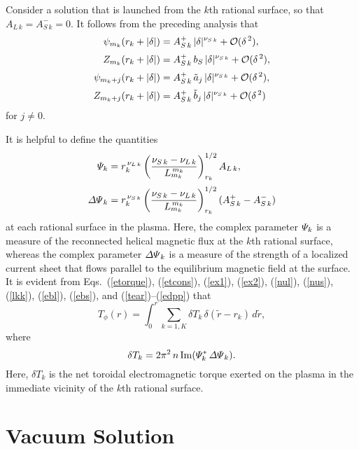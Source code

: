 \documentclass[12pt,prb,aps]{revtex4-1}
\begin{document}
Consider a solution that is launched from the $k$th rational surface, so that $A_{L\,k} = A_{S\,k}^-=0$. It follows from the preceding analysis that
\begin{align}
\psi_{m_k}(r_k+|\delta|) &= A_{S\,k}^+\,|\delta|^{\nu_{S\,k}}+ {\cal O}(\delta^{\,2}),\\[0.5ex]
Z_{m_k}(r_k+|\delta|) &= A_{S\,k}^+\,b_S\,|\delta|^{\nu_{S\,k}}+ {\cal O}(\delta^{\,2}),\\[0.5ex]
\psi_{m_k+j}(r_k+|\delta|)& = A_{S\,k}^+\,\tilde{a}_j\,|\delta|^{\nu_{S\,k}}+ {\cal O}(\delta^{\,2}),\\[0.5ex]
Z_{m_k+j}(r_k+|\delta|) &= A_{S\,k}^+\,\tilde{b}_j\,|\delta|^{\nu_{S\,k}}+ {\cal O}(\delta^{\,2})
\end{align}
for $j\neq 0$. 

It is helpful to define the quantities\,\cite{am1}
\begin{align}\label{Psidef}
{\mit\Psi}_k&= r_k^{\,\nu_{L\,k}}\left(\frac{\nu_{S\,k}-\nu_{L\,k}}{L_{m_k}^{\,{m_k}}}\right)^{1/2}_{r_k} A_{L\,k},\\[0.5ex]
{\mit\Delta\Psi}_k &= r_k^{\,\nu_{S\,k}}\left(\frac{\nu_{S\,k}-\nu_{L\,k}}{L_{m_k}^{\,m_k}}\right)^{1/2}_{r_k} (A_{S\,k}^+ - A_{S\,k}^-)\label{edpp}
\end{align}
at each rational surface in the plasma. Here, the complex parameter ${\mit\Psi}_k$ is a measure of the reconnected helical magnetic flux at the $k$th rational surface, whereas
the complex parameter ${\mit\Delta\Psi}_k$ is a measure of the strength of a localized current sheet that flows parallel to the equilibrium magnetic field at the surface. 
It is evident from Eqs.~(\ref{etorque}), (\ref{etcons}), (\ref{ex1}), (\ref{ex2}), (\ref{nul}), (\ref{nus}), (\ref{lkk}), (\ref{ebl}), (\ref{ebs}), and (\ref{tear})--(\ref{edpp}) that\,\cite{am1,am3}
\begin{equation}\label{e204z}
T_\phi(r) =\int_0^r \sum_{k=1,K}\delta T_k\,\delta(\tilde{r}-r_k)\,d\tilde{r},
\end{equation}
where
\begin{equation}\label{e194t}
\delta T_k = 2\pi^2\,n\,{\rm Im}({\mit\Psi}_k^\ast\,{\mit\Delta\Psi}_k).
\end{equation}
Here, $\delta T_k$ is the net toroidal electromagnetic torque exerted on the plasma in the immediate vicinity of the $k$th rational
surface. 

\section{Vacuum Solution}\label{vacxx}
\end{document}
